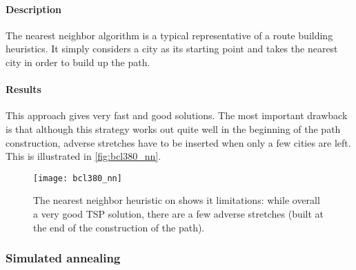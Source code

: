 ﻿\documentclass[a4paper,english,11pt,]{scrartcl}
\begin{document}
\paragraph{Description}
The nearest neighbor algorithm is a typical representative of
a route building heuristics. It simply considers a city as its starting point
and takes the nearest city in order to build up the path. 


\paragraph{Results}
This approach gives very fast and good solutions. The most important drawback is that although this strategy works out quite well in the beginning of the path construction, adverse stretches have to be inserted when only a few cities are left. This is illustrated in \autoref{fig:bcl380_nn}.

\begin{figure}[hbpt]
\centering
\texttt{[image: bcl380\_nn]}
\caption[The nearest neighbor heuristic on .]{The nearest neighbor heuristic on  shows it limitations: while overall a very good TSP solution, there are a few adverse stretches (built at the end of the construction of the path).}
\label{fig:bcl380_nn}
\end{figure}

\subsubsection{Simulated annealing}
\end{document}
